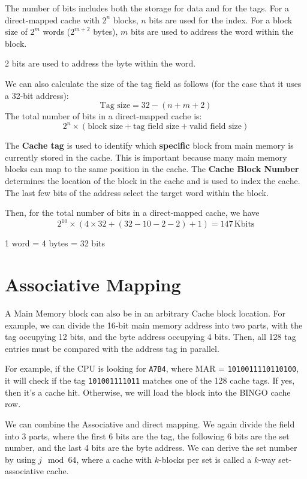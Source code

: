 The number of bits includes both the storage for data and for the tags. For a direct-mapped cache with \(2^n\) blocks, \(n\) bits are used for the index. For a block size of \(2^m\) words (\(2^{m+2}\) bytes), \(m\) bits are used to address the word within the block.

2 bits are used to address the byte within the word.

We can also calculate the size of the tag field as follows (for the case that it uses a 32-bit address):
\[
  \text{Tag size} = 32 - (n + m + 2)
\]
The total number of bits in a direct-mapped cache is:
\[
  2^n \times (\text{block size} + \text{tag field size} + \text{valid field size})
\]

The \textbf{Cache tag} is used to identify which \textbf{specific} block from main memory is currently stored in the cache. This is important because many main memory blocks can map to the same position in the cache. The \textbf{Cache Block Number} determines the location of the block in the cache and is used to index the cache. The last few bits of the address select the target word within the block.

Then, for the total number of bits in a direct-mapped cache, we have
\[
  2^{10} \times (4 \times 32 + (32 - 10 - 2 - 2) + 1) = 147\,\text{Kbits}
\]

\begin{remark}
  1 word = 4 bytes = 32 bits
\end{remark}

\section{Associative Mapping}
A Main Memory block can also be in an arbitrary Cache block location. For example, we can divide the 16-bit main memory address into two parts, with the tag occupying 12 bits, and the byte address occupying 4 bits. Then, all 128 tag entries must be compared with the address tag in parallel.

For example, if the CPU is looking for \verb|A7B4|, where MAR = \verb|1010011110110100|, it will check if the tag \verb|101001111011| matches one of the 128 cache tags. If yes, then it's a cache hit. Otherwise, we will load the block into the BINGO cache row.

We can combine the Associative and direct mapping. We again divide the field into 3 parts, where the first 6 bits are the tag, the following 6 bits are the set number, and the last 4 bits are the byte address. We can derive the set number by using \(j \mod 64\), where a cache with \(k\)-blocks per set is called a \(k\)-way set-associative cache.

